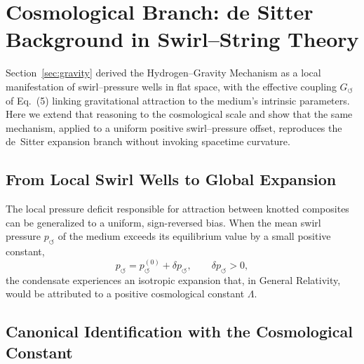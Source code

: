 \documentclass[10pt,reprint,aps,onecolumn,nofootinbib]{revtex4-2}
\begin{document}
\section{Cosmological Branch: de Sitter Background in Swirl--String Theory}
\label{sec:desitter}

    \begin{tcolorbox}[colframe=gray, title={Canonical Context}]
    Section~\ref{sec:gravity} derived the Hydrogen--Gravity Mechanism as a local manifestation of swirl--pressure wells in flat space, with the effective coupling $G_{\!\circlearrowleft}$ of Eq.~(5) linking gravitational attraction to the medium's intrinsic parameters.
    Here we extend that reasoning to the cosmological scale and show that the same mechanism, applied to a uniform positive swirl--pressure offset, reproduces the de~Sitter expansion branch without invoking spacetime curvature.
    \end{tcolorbox}

    \subsection{From Local Swirl Wells to Global Expansion}

        The local pressure deficit responsible for attraction between knotted composites can be generalized to a uniform, sign-reversed bias.
        When the mean swirl pressure $p_{\!\circlearrowleft}$ of the medium exceeds its equilibrium value by a small positive constant,
        \begin{equation}
        p_{\!\circlearrowleft} = p_{\!\circlearrowleft}^{(0)} + \delta p_{\!\circlearrowleft},
        \qquad
        \delta p_{\!\circlearrowleft} > 0,
        \end{equation}
        the condensate experiences an isotropic expansion that, in General Relativity, would be attributed to a positive cosmological constant $\Lambda$.

    \subsection{Canonical Identification with the Cosmological Constant}
\end{document}
